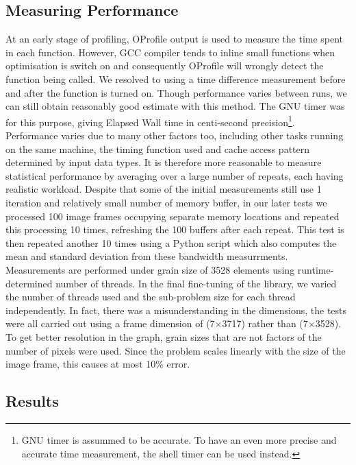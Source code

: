 \documentclass[journal]{IEEEtran}
\begin{document}
\subsection{Measuring Performance}
At an early stage of profiling, OProfile output is used to measure the time spent in each function. However, GCC compiler tends to inline small functions when optimisation is switch on and consequently OProfile will wrongly detect the function being called. We resolved to using a time difference measurement before and after the function is turned on. Though performance varies between runs, we can still obtain reasonably good estimate with this method. The GNU timer was for this purpose, giving Elapsed Wall time in centi-second precision\footnote{GNU timer is assummed to be accurate. To have an even more precise and accurate time measurement, the shell timer can be used instead.}. \\

Performance varies due to many other factors too, including other tasks running on the same machine, the timing function used and cache access pattern determined by input data types. It is therefore more reasonable to measure statistical performance by averaging over a large number of repeats, each having realistic workload. Despite that some of the initial measurements still use 1 iteration and relatively small number of memory buffer, in our later tests we processed 100 image frames occupying separate memory locations and repeated this processing 10 times, refreshing the 100 buffers after each repeat. This test is then repeated another 10 times using a Python script which also computes the mean and standard deviation from these bandwidth measurrments. Measurements are performed under grain size of 3528 elements using runtime-determined number of threads. In the final fine-tuning of the library, we varied the number of threads used and the sub-problem size for each thread independently. 
In fact, there was a misunderstanding in the dimensions, the tests were all carried out using a frame dimension of (7$\times$3717) rather than (7$\times$3528). To get better resolution in the graph, grain sizes that are not factors of the number of pixels were used. Since the problem scales linearly with the size of the image frame, this causes at most 10\% error.

\subsection{Results}
\end{document}
